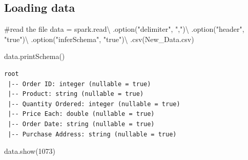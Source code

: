 \documentclass[
  letterpaper,
  DIV=11,
  numbers=noendperiod]{scrartcl}
\newenvironment{Shaded}{\begin{snugshade}}{\end{snugshade}}
\newcommand{\CommentTok}[1]{\textcolor[rgb]{0.37,0.37,0.37}{#1}}
\newcommand{\DecValTok}[1]{\textcolor[rgb]{0.68,0.00,0.00}{#1}}
\newcommand{\NormalTok}[1]{\textcolor[rgb]{0.00,0.23,0.31}{#1}}
\newcommand{\OperatorTok}[1]{\textcolor[rgb]{0.37,0.37,0.37}{#1}}
\newcommand{\StringTok}[1]{\textcolor[rgb]{0.13,0.47,0.30}{#1}}
\begin{document}
\subsection{Loading data}\label{loading-data}

\begin{Shaded}
\begin{Highlighting}[]
\CommentTok{\#read the file}
\NormalTok{data }\OperatorTok{=}\NormalTok{ spark.read}\OperatorTok{\textbackslash{}}
\NormalTok{    .option(}\StringTok{"delimiter"}\NormalTok{, }\StringTok{","}\NormalTok{)}\OperatorTok{\textbackslash{}}
\NormalTok{    .option(}\StringTok{"header"}\NormalTok{, }\StringTok{"true"}\NormalTok{)}\OperatorTok{\textbackslash{}}
\NormalTok{    .option(}\StringTok{"inferSchema"}\NormalTok{, }\StringTok{"true"}\NormalTok{)}\OperatorTok{\textbackslash{}}
\NormalTok{    .csv(}\StringTok{\textquotesingle{}New\_Data.csv\textquotesingle{}}\NormalTok{)}
\end{Highlighting}
\end{Shaded}

\begin{Shaded}
\begin{Highlighting}[]
\NormalTok{data.printSchema()}
\end{Highlighting}
\end{Shaded}

\begin{verbatim}
root
 |-- Order ID: integer (nullable = true)
 |-- Product: string (nullable = true)
 |-- Quantity Ordered: integer (nullable = true)
 |-- Price Each: double (nullable = true)
 |-- Order Date: string (nullable = true)
 |-- Purchase Address: string (nullable = true)
\end{verbatim}

\begin{Shaded}
\begin{Highlighting}[]
\NormalTok{data.show(}\DecValTok{1073}\NormalTok{)}
\end{Highlighting}
\end{Shaded}
\end{document}
